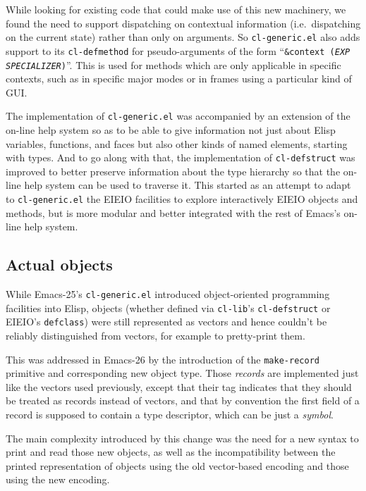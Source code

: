 \documentclass[format=acmsmall, review=false, screen=true]{acmart}
\newcommand \Elisp {Elisp}
\begin{document}
While looking for existing code that could make use of this new machinery,
we found the need to support dispatching on contextual information
(i.e.~dispatching on the current state) rather than only on arguments.
So \texttt{cl-generic.el} also adds support to its \texttt{cl-defmethod} for
pseudo-arguments of the form ``\texttt{\&context (\textsl{EXP}
  \textsl{SPECIALIZER})}''.  This is used for methods which are only
applicable in specific contexts, such as in specific major modes or in
frames using a particular kind of GUI.

The implementation of \texttt{cl-generic.el} was accompanied by an extension
of the on-line help system so as to be able to give information not just
about \Elisp{} variables, functions, and faces but also other kinds of named
elements, starting with types.  And to go along with that, the implementation
of \texttt{cl-defstruct} was improved to better preserve information about
the type hierarchy so that the on-line help system can be used to traverse
it.  This started as an attempt to adapt to \texttt{cl-generic.el} the EIEIO
facilities to explore interactively EIEIO objects and methods, but is more
modular and better integrated with the rest of Emacs's on-line help system.

\subsection{Actual objects}  %

While Emacs-25's \texttt{cl-generic.el} introduced object-oriented
programming facilities into \Elisp{}, objects (whether defined via
\texttt{cl-lib}'s \texttt{cl-defstruct} or EIEIO's \texttt{defclass}) were
still represented as vectors and hence couldn't be reliably distinguished
from vectors, for example to pretty-print them.

This was addressed in Emacs-26 by the introduction of the
\texttt{make-record} primitive and corresponding new object type.
Those \emph{records} are implemented just like the vectors used previously,
except that their tag indicates that they should be treated as records
instead of vectors, and that by convention the first field of a record is
supposed to contain a type descriptor, which can be just a \emph{symbol}.

The main complexity introduced by this change was the need for a new syntax
to print and read those new objects, as well as the incompatibility between
the printed representation of objects using the old vector-based encoding
and those using the new encoding.
\end{document}
